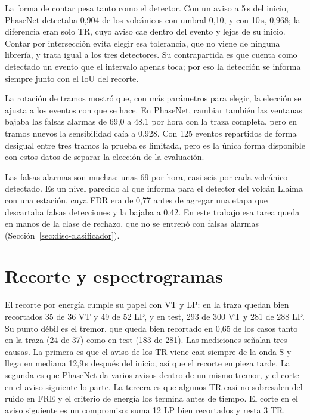 La forma de contar pesa tanto como el detector. Con un aviso a 5\,s del
inicio, PhaseNet detectaba 0,904 de los volcánicos con umbral 0,10, y con
10\,s, 0,968; la diferencia eran solo TR, cuyo aviso cae dentro del evento y
lejos de su inicio. Contar por intersección evita elegir esa tolerancia, que
no viene de ninguna librería, y trata igual a los tres detectores. Su
contrapartida es que cuenta como detectado un evento que el intervalo apenas
toca; por eso la detección se informa siempre junto con el IoU del recorte.

La rotación de tramos mostró que, con más parámetros para elegir, la elección
se ajusta a los eventos con que se hace. En PhaseNet, cambiar también las
ventanas bajaba las falsas alarmas de 69,0 a 48,1 por hora con la traza
completa, pero en tramos nuevos la sensibilidad caía a 0,928. Con 125 eventos
repartidos de forma desigual entre tres tramos la prueba es limitada, pero es
la única forma disponible con estos datos de separar la elección de la
evaluación.

Las falsas alarmas son muchas: unas 69 por hora, casi seis por cada volcánico
detectado. Es un nivel parecido al que informa \textcite{soto2016llaima} para
el detector del volcán Llaima con una estación, cuya FDR era de 0,77 antes de
agregar una etapa que descartaba falsas detecciones y la bajaba a 0,42. En
este trabajo esa tarea queda en manos de la clase de rechazo, que no se
entrenó con falsas alarmas (Sección~\ref{sec:disc-clasificador}).

\section{Recorte y espectrogramas}
\label{sec:disc-recorte}

El recorte por energía cumple su papel con VT y LP: en la traza quedan bien
recortados 35 de 36 VT y 49 de 52 LP, y en test, 293 de 300 VT y 281 de 288
LP. Su punto débil es el tremor, que queda bien recortado en 0,65 de los casos
tanto en la traza (24 de 37) como en test (183 de 281). Las mediciones
señalan tres causas. La primera es que el aviso de los TR viene casi siempre
de la onda S y llega en mediana 12,9\,s después del inicio, así que el recorte
empieza tarde. La segunda es que PhaseNet da varios avisos dentro de un mismo
tremor, y el corte en el aviso siguiente lo parte. La tercera es que algunos
TR casi no sobresalen del ruido en FRE y el criterio de energía los termina
antes de tiempo. El corte en el aviso siguiente es un compromiso: suma 12 LP
bien recortados y resta 3 TR.

